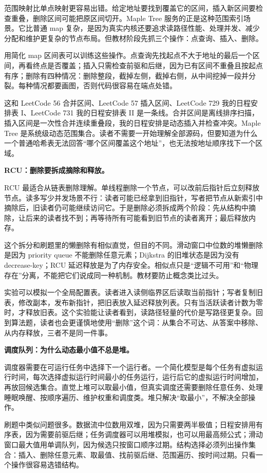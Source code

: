 范围映射比单点映射更容易出错。给定地址要找到覆盖它的区间，插入新区间要检查重叠，删除区间可能把原区间切开。Maple Tree 服务的正是这种范围索引场景。它比普通 map 复杂，是因为真实内核还要追求读路径性能、处理并发、减少分配和维护更复杂的节点布局。但教材阶段先抓三个操作：点查询、插入、删除。

用简化 map 区间表可以训练这些操作。点查询先找起点不大于地址的最后一个区间，再看终点是否覆盖；插入只需检查前驱和后继，因为已有区间不重叠且按起点有序；删除有四种情况：删除整段，截掉左侧，截掉右侧，从中间挖掉一段并分裂。每种情况都要画图，否则代码很容易在端点处错。

这和 LeetCode 56 合并区间、LeetCode 57 插入区间、LeetCode 729 我的日程安排表 I、LeetCode 731 我的日程安排表 II 是一条线。合并区间是离线排序扫描，插入区间是一次性合并连续重叠段，我的日程安排是动态插入并检查冲突。Maple Tree 是系统级动态范围集合。读者不需要一开始理解全部源码，但要知道为什么一个普通哈希表无法回答“哪个区间覆盖这个地址”，也无法按地址顺序找下一个区域。

\noindent\textbf{RCU：删除要拆成摘除和释放。}

RCU 最适合从链表删除理解。单线程删除一个节点，可以改前后指针后立刻释放节点。读多写少并发场景不行：读者可能已经拿到旧指针，写者把节点从新索引中摘除后，旧读者仍可能继续访问它。于是删除必须拆成两个阶段：先从结构中摘除，让后来的读者找不到；再等待所有可能看到旧节点的读者离开；最后释放内存。

这个拆分和刷题里的懒删除有相似直觉，但目的不同。滑动窗口中位数的堆懒删除是因为 priority queue 不能删除任意元素；Dijkstra 的旧堆状态是因为没有 decrease-key；RCU 延迟释放是为了内存安全。相似点只是“逻辑不可用”和“物理存在”分离，不能把它们说成同一种机制。教材要防止概念类比过头。

实验可以模拟一个全局配置表。读者进入读侧临界区后读取当前指针；写者复制旧表，修改副本，发布新指针，把旧表放入延迟释放列表。只有当活跃读者计数为零时，才释放旧表。这个实验能让读者看到，读路径轻量的代价是写路径更复杂。回到算法题，读者也会更谨慎地使用“删除”这个词：从集合不可达、从答案中移除、从内存释放，三者不是同一件事。

\noindent\textbf{调度队列：为什么动态最小值不总是堆。}

调度器需要在可运行任务中选择下一个运行者。一个简化模型是每个任务有虚拟运行时间，每次选择虚拟运行时间最小的任务运行，运行后它的虚拟运行时间增加，再放回候选集合。直觉上堆可以取最小值，但真实调度还需要删除任意任务、处理睡眠唤醒、按顺序遍历、维护权重和调度类。堆只解决“取最小”，不解决全部操作。

刷题中类似问题很多。数据流中位数用双堆，因为只需要两半极值；日程安排用有序表，因为需要前驱后继；任务调度器可以用堆模拟，也可以用最高频公式；滑动窗口最大值用单调队列，因为候选只按窗口顺序过期。结构选择必须列出操作集合：插入、删除任意元素、取最值、找前驱后继、范围遍历、按时间过期。只看一个操作很容易选错结构。

